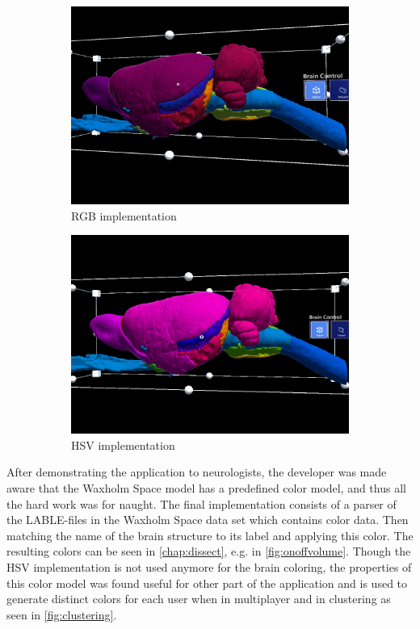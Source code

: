 \begin{figure}[h]
\centering
\begin{subfigure}[b]{0.4\textwidth}
    \includegraphics[width=\textwidth]{fig/nevrolens_brain_rgb_original.png}
    \caption{RGB implementation}
\end{subfigure}
\begin{subfigure}[b]{0.4\textwidth}
    \includegraphics[width=\textwidth]{fig/nevrolens_brain_hsv_imitate.png}
    \caption{HSV implementation}
\end{subfigure}
\caption{}
\label{fig:hsvcolors}
\end{figure}

After demonstrating the application to neurologists, the developer was made aware that the Waxholm Space model has a predefined color model, and thus all the hard work was for naught. The final implementation consists of a parser of the LABLE-files in the Waxholm Space data set which contains color data. Then matching the name of the brain structure to its label and applying this color. The resulting colors can be seen in \autoref{chap:dissect}, e.g. in \autoref{fig:onoffvolume}. 
Though the HSV implementation is not used anymore for the brain coloring, the properties of this color model was found useful for other part of the application and is used to generate distinct colors for each user when in multiplayer and in clustering as seen in \autoref{fig:clustering}.

